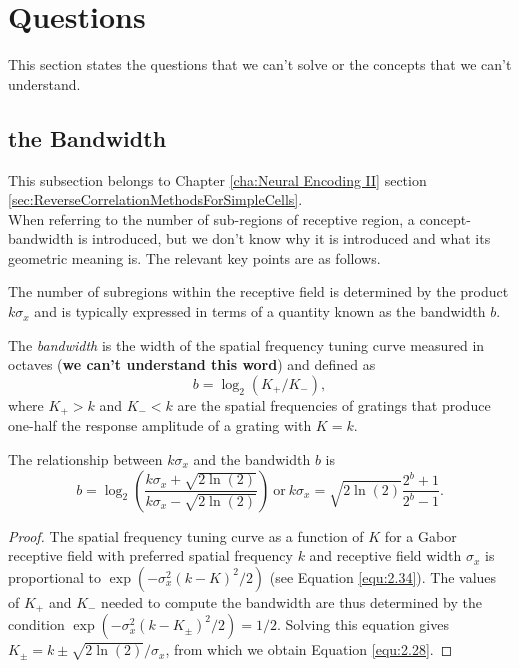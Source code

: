 
\section{Questions}
\label{sec:questions}

This section states the questions that we can't solve or the concepts that we can't understand.
\subsection{the Bandwidth}
\label{sec:bandwidth}
This subsection belongs to Chapter \ref{cha:Neural Encoding II} section \ref{sec:ReverseCorrelationMethodsForSimpleCells}.\\
When referring to the number of sub-regions of receptive region, a
concept-bandwidth is introduced, but we don't know why it is
introduced and what its geometric meaning is. The relevant key points are as follows.

\begin{rem}
  The number of subregions within the receptive field is determined by the product $k\sigma_x$ and is typically expressed in terms of a quantity known as the bandwidth $b$.
\end{rem}

\begin{defn}
  The \emph{bandwidth} is the width of the spatial frequency tuning curve measured in octaves (\textbf{we can't understand this word}) and defined as
  \begin{displaymath}
    b = \log_2(K_+/K_-),
  \end{displaymath}
  where $K_+ > k$ and $K_-<k$ are the spatial frequencies of gratings that produce one-half the response amplitude of a grating with $K=k$.
\end{defn}

\begin{prop}
  The relationship between $k\sigma_x$ and the bandwidth $b$ is
  \begin{equation}
    \label{equ:2.28}
    b = \log_2\left(\frac{k\sigma_x+\sqrt{2\ln(2)}}{k\sigma_x-\sqrt{2\ln(2)}}\right)\ \text{or}\  k\sigma_x = \sqrt{2\ln(2)}\frac{2^b+1}{2^b-1}.
  \end{equation}
\end{prop}
\begin{proof}
  The spatial frequency tuning curve as a function of $K$ for a Gabor receptive field with preferred spatial frequency $k$ and receptive field width $\sigma_x$ is proportional to $\exp(-\sigma_x^2(k - K)^2/2)$ (see Equation \ref{equ:2.34}). The values of $K_+$ and $K_-$ needed to compute the bandwidth are thus determined by the condition $\exp(-\sigma_x^2(k - K_{\pm})^2/2) = 1/2$. Solving this equation gives $K_{\pm} = k \pm \sqrt{2\ln(2)}/\sigma_x$, from which we obtain Equation \ref{equ:2.28}.
\end{proof}


